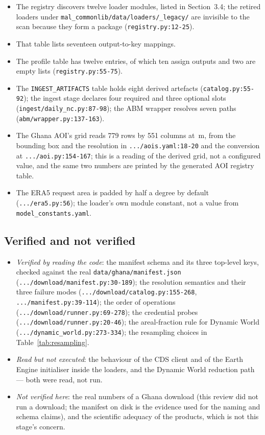 \documentclass[11pt,a4paper]{article}
\newcommand{\code}[1]{\texttt{#1}}
\begin{document}
\begin{itemize}
\item The registry discovers twelve loader modules, listed in
Section~3.4; the retired loaders under
\code{mal\_commonlib/data/loaders/\_legacy/} are invisible to the scan
because they form a package (\code{registry.py:12-25}).
\item That table lists seventeen output-to-key mappings.
\item The profile table has twelve entries, of which ten assign outputs and
two are empty lists (\code{registry.py:55-75}).
\item The \code{INGEST\_ARTIFACTS} table holds eight derived artefacts
(\code{catalog.py:55-92}); the ingest stage declares four required and three
optional slots (\code{ingest/daily\_nc.py:87-98}); the ABM wrapper resolves
seven paths (\code{abm/wrapper.py:137-163}).
\item The Ghana AOI's grid reads 779 rows by 551 columns at
\,m, from the bounding box and the resolution
in \code{.../aois.yaml:18-20} and the conversion at
\code{.../aoi.py:154-167}; this is a reading of the derived grid, not a
configured value, and the same two numbers are printed by the generated AOI
registry table.
\item The ERA5 request area is padded by half a degree by default
(\code{.../era5.py:56}); the loader's own module constant, not a value from
\code{model\_constants.yaml}.
\end{itemize}


\subsection{Verified and not verified}

\begin{itemize}
\item \emph{Verified by reading the code}: the manifest schema and its three
top-level keys, checked against the real \code{data/ghana/manifest.json}
(\code{.../download/manifest.py:30-189}); the resolution semantics and their
three failure modes (\code{.../download/catalog.py:155-268},
\code{.../manifest.py:39-114}); the order of operations
(\code{.../download/runner.py:69-278}); the credential probes
(\code{.../download/runner.py:20-46}); the areal-fraction rule for Dynamic
World (\code{.../dynamic\_world.py:273-334}); the resampling choices in
Table~\ref{tab:resampling}.
\item \emph{Read but not executed}: the behaviour of the CDS client and of the
Earth Engine initialiser inside the loaders, and the Dynamic World
reduction path --- both were read, not run.
\item \emph{Not verified here}: the real numbers of a Ghana download (this
review did not run a download; the manifest on disk is the evidence used for
the naming and schema claims), and the scientific adequacy of the products,
which is not this stage's concern.
\end{itemize}
\end{document}

